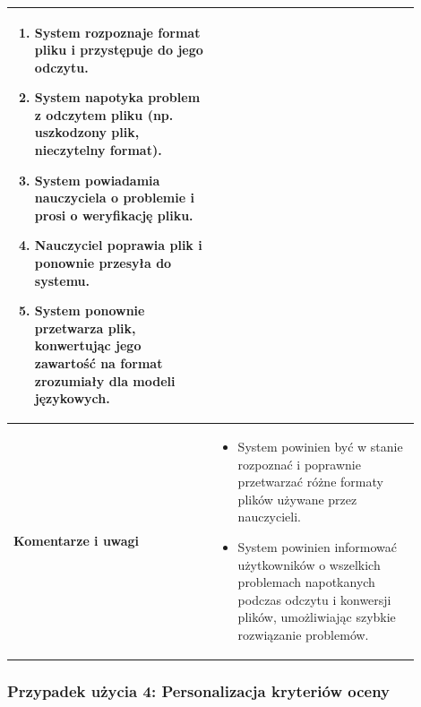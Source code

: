 \documentclass[a4paper, 12pt]{article}
\begin{document}
\begin{center}
\begin{longtable}{|p{0.45\linewidth}|p{0.45\linewidth}|}
\begin{enumerate}
    \item System rozpoznaje format pliku i przystępuje do jego odczytu.
    \item System napotyka problem z odczytem pliku (np. uszkodzony plik, nieczytelny format).
    \item System powiadamia nauczyciela o problemie i prosi o weryfikację pliku.
    \item Nauczyciel poprawia plik i ponownie przesyła do systemu.
    \item System ponownie przetwarza plik, konwertując jego zawartość na format zrozumiały dla modeli językowych.
\end{enumerate} \\
\hline
\textbf{Komentarze i uwagi} &
\begin{itemize}
    \item System powinien być w stanie rozpoznać i poprawnie przetwarzać różne formaty plików używane przez nauczycieli.
    \item System powinien informować użytkowników o wszelkich problemach napotkanych podczas odczytu i konwersji plików, umożliwiając szybkie rozwiązanie problemów.
\end{itemize} \\
\hline
\end{longtable}
\end{center}

\subsubsection*{Przypadek użycia 4: Personalizacja kryteriów oceny}
\end{document}
